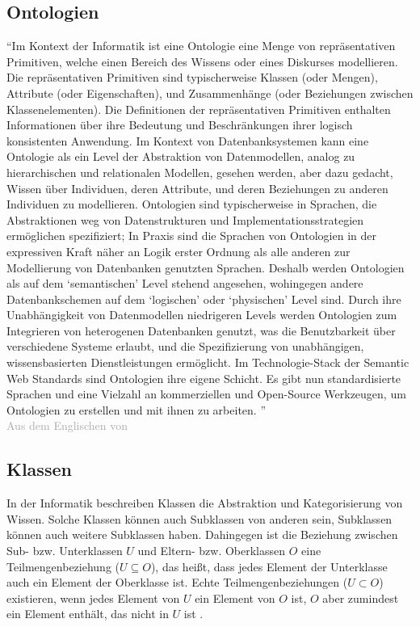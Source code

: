 \subsection{Ontologien}
\label{sub:ontology}
\enquote{Im Kontext der Informatik ist eine Ontologie eine Menge von repräsentativen Primitiven, welche einen Bereich des Wissens oder eines Diskurses modellieren.
Die repräsentativen Primitiven sind typischerweise Klassen (oder Mengen), Attribute (oder Eigenschaften), und Zusammenhänge (oder Beziehungen zwischen Klassenelementen).
Die Definitionen der repräsentativen Primitiven enthalten Informationen über ihre Bedeutung und Beschränkungen ihrer logisch konsistenten Anwendung.
Im Kontext von Datenbanksystemen kann eine Ontologie als ein Level der Abstraktion von Datenmodellen, analog zu hierarchischen und relationalen Modellen,
gesehen werden, aber dazu gedacht, Wissen über Individuen, deren Attribute, und deren Beziehungen zu anderen Individuen zu modellieren.
Ontologien sind typischerweise in Sprachen, die Abstraktionen weg von Datenstrukturen und Implementationsstrategien ermöglichen spezifiziert;
In Praxis sind die Sprachen von Ontologien in der expressiven Kraft näher an Logik erster Ordnung als alle anderen zur Modellierung von Datenbanken genutzten Sprachen.
Deshalb werden Ontologien als auf dem \enquote{semantischen} Level stehend angesehen, wohingegen andere Datenbankschemen auf dem \enquote{logischen} oder \enquote{physischen} Level sind.
Durch ihre Unabhängigkeit von Datenmodellen niedrigeren Levels werden Ontologien zum Integrieren von heterogenen Datenbanken genutzt,
was die Benutzbarkeit über verschiedene Systeme erlaubt, und die Spezifizierung von unabhängigen, wissensbasierten  Dienstleistungen ermöglicht.
Im Technologie-Stack der Semantic Web Standards sind Ontologien ihre eigene Schicht.
Es gibt nun standardisierte Sprachen und eine Vielzahl an kommerziellen und Open-Source Werkzeugen, um Ontologien zu erstellen und mit ihnen zu arbeiten.
}\\
\textcolor{darkgray}{Aus dem Englischen von \citet{ontologygruber}}

\subsection{Klassen}

In der Informatik beschreiben Klassen die Abstraktion und Kategorisierung von Wissen.
Solche Klassen können auch Subklassen von anderen sein, Subklassen können auch weitere Subklassen haben.
Dahingegen ist die Beziehung zwischen Sub- bzw. Unterklassen $U$ und Eltern- bzw. Oberklassen $O$ eine Teilmengenbeziehung ($U \subseteq O$),
das heißt, dass jedes Element der Unterklasse auch ein Element der Oberklasse ist.
Echte Teilmengenbeziehungen ($U \subset O$) existieren, wenn jedes Element von $U$ ein Element von $O$ ist, $O$ aber zumindest ein Element enthält,
das nicht in $U$ ist \citep[S.~261]{semanticwebgrundlagen}.

